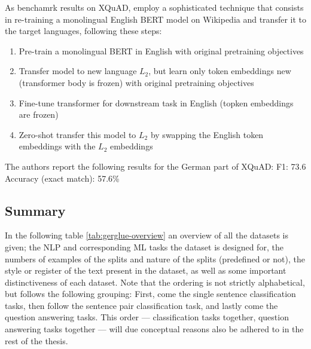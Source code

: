 



As benchamrk results on XQuAD, \citeauthor{artetxe2019cross} employ a sophisticated technique
that consists in re-training a monolingual English BERT model on Wikipedia and transfer it to the
target languages, following these steps:

\begin{enumerate}
    \item Pre-train a monolingual BERT in English with original pretraining objectives
    \item Transfer model to new language $L_2$, but learn only token embeddings new (transformer body is frozen) with original pretraining objectives
    \item Fine-tune transformer for downstream task in English (topken embeddings are frozen)
    \item Zero-shot transfer this model to $L_2$ by swapping the English token embeddings with the $L_2$ embeddings
\end{enumerate}

The authors report the following results for the German part of XQuAD:
F1: 73.6
Accuracy (exact match): 57.6\%

\subsection{Summary}

In the following table \ref{tab:gerglue-overview} an overview of all the datasets is given;
the NLP and corresponding ML tasks the dataset is designed for, the numbers of examples of
the splits and nature of the splits (predefined or not), the style or register of the text
present in the dataset, as well as some important distinctiveness of each dataset. Note that
the ordering is not strictly alphabetical, but follows the following grouping: First, come the
single sentence classification tasks, then follow the sentence pair classification task,
and lastly come the question answering tasks. This order --- classification tasks together,
question answering tasks together --- will due conceptual reasons also be adhered to in the
rest of the thesis.

